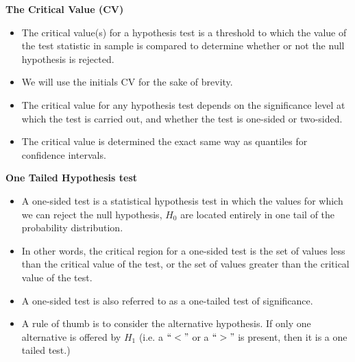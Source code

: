 


\noindent \textbf{The Critical Value (CV)}


\begin{itemize}
\item The critical value(s) for a hypothesis test is a threshold to which the value of the test statistic in sample is compared to determine whether or not the null hypothesis is rejected.
\item We will use the initials CV for the sake of brevity.
\item The critical value for any hypothesis test depends on the significance level at which the test is carried out, and whether the test is one-sided or two-sided.
\item The critical value is determined the exact same way as quantiles for confidence intervals.

\end{itemize}





\noindent \textbf{One Tailed Hypothesis test}
\begin{itemize}
\item A one-sided test is a statistical hypothesis test in which the values for which we can reject the null hypothesis, $H_0$ are located entirely in one tail of the probability distribution.

\item In other words, the critical region for a one-sided test is the set of values less than the critical value of the test, or the set of values greater than the critical value of the test.

\item A one-sided test is also referred to as a one-tailed test of significance.

\item A rule of thumb is to consider the alternative hypothesis.  If only one alternative is offered by $H_1$ (i.e. a $``<"$ or a $``>"$ is present, then it is a one tailed test.)

\end{itemize}




